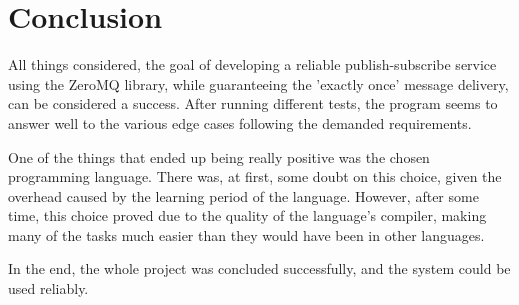 \section{Conclusion}
\label{sec:Conclusion}

All things considered, the goal of developing a reliable publish-subscribe service using the ZeroMQ library, while guaranteeing the 'exactly once' message delivery, can be considered a success. After running different tests, the program seems to answer well to the various edge cases following the demanded requirements. 

One of the things that ended up being really positive was the chosen programming language. There was, at first, some doubt on this choice, given the overhead caused by the learning period of the language. However, after some time, this choice proved due to the quality of the language's compiler, making many of the tasks much easier than they would have been in other languages. 

In the end, the whole project was concluded successfully, and the system could be used reliably. 